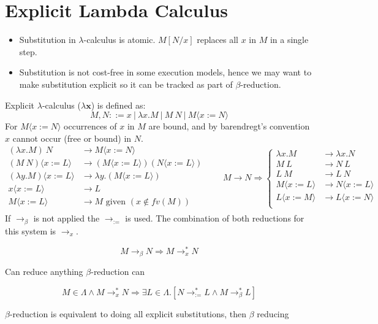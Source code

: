 \section{Explicit Lambda Calculus}
\begin{itemize}
    \item Substitution in $\lambda$-calculus is atomic. $M[N/x]$ replaces all $x$ in $M$ in a single step.
    \item Substitution is not cost-free in some execution models, hence we may want to make substitution explicit so it can be tracked as part of $\beta$-reduction.
\end{itemize}
Explicit $\lambda$-calculus ($\lambda \mathbf{x}$) is defined as:
\[M,N ::= x \ | \ \lambda x . M \ | \ M \ N \ | \ M \langle x := N \rangle \]
For $M \langle x := N \rangle$ occurrences of $x$ in $M$ are bound, and by barendregt's convention $x$ cannot occur (free or bound) in $N$.
\[\begin{split}
    (\lambda x . M) \ N & \to M \langle x := N \rangle \\
    (M \ N) \langle x := L \rangle & \to (M \langle x := L \rangle)(N \langle x := L \rangle) \\
    (\lambda y . M)\langle x := L \rangle & \to \lambda y . (M\langle x := L \rangle) \\
    x \langle x := L \rangle & \to L \\
    M \langle x := L \rangle & \to M \text{ given } (x \not\in fv(M)) \\
\end{split} \qquad M \to N \Rightarrow \begin{cases}
    \lambda x.M & \to \lambda x.N \\
    M \ L & \to N \ L \\
    L \ M & \to L \ N \\
    M \langle x := L \rangle &\to N \langle x := L \rangle \\
    L \langle x := M \rangle & \to L\langle x := N \rangle \\
\end{cases}\]
If $\to_\beta$ is not applied the $\to_{:=}$ is used. The combination of both reductions for this system is $\to_x$.
\\\begin{minipage}[t]{.49\textwidth}
    \[M \to_\beta N \Rightarrow M \to_x^* N\]
    \begin{center}
        Can reduce anything $\beta$-reduction can
    \end{center}
\end{minipage}
\hfill
\begin{minipage}[t]{.49\textwidth}
    \[M \in \Lambda \land M \to_x^* N \Rightarrow \exists L \in \Lambda . [N \to_{:=}^* L \land M \to_\beta^* L]\]
    \begin{center}
        $\beta$-reduction is equivalent to doing all explicit substitutions, then $\beta$ reducing
    \end{center}
\end{minipage}

